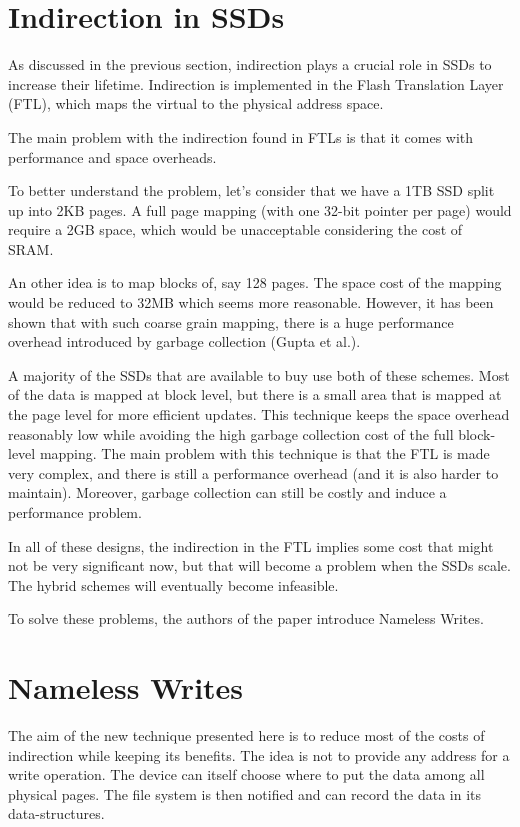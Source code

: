 \documentclass[twocolumn,a4paper,10pt]{article}
\begin{document}
\section*{Indirection in SSDs}
As discussed in the previous section, indirection plays a crucial role in
SSDs to increase their lifetime. Indirection is implemented in the Flash
Translation Layer (FTL), which maps the virtual to the physical address space. 

The main problem with the indirection found in FTLs is that it comes with
performance and space overheads.

To better understand the problem, let's consider that we have a 1TB SSD split
up into 2KB pages. A full page mapping (with one 32-bit pointer per page)
would require a 2GB space, which would be unacceptable considering the cost
of SRAM.

An other idea is to map blocks of, say 128 pages. The space cost of the
mapping would be reduced to 32MB which seems more reasonable. However, it has
been shown that with such coarse grain mapping, there is a huge performance
overhead introduced by garbage collection (Gupta et al.).

A majority of the SSDs that are available to buy use both of these schemes.
Most of the data is mapped at block level, but there is a small area that is
mapped at the page level for more efficient updates. This technique keeps
the space overhead reasonably low while avoiding the high garbage collection
cost of the full block-level mapping. The main problem with this technique is
that the FTL is made very complex, and there is still a performance overhead
(and it is also harder to maintain). Moreover, garbage collection can still be
costly and induce a performance problem.

In all of these designs, the indirection in the FTL implies some cost that
might not be very significant now, but that will become a problem when the
SSDs scale. The hybrid schemes will eventually become infeasible.

To solve these problems, the authors of the paper introduce Nameless Writes.

\section*{Nameless Writes}
The aim of the new technique presented here is to reduce most of the costs of
indirection while keeping its benefits. The idea is not to provide any address
for a write operation. The device can itself choose where to put the data
among all physical pages. The file system is then notified and can record the
data in its data-structures.
\end{document}
